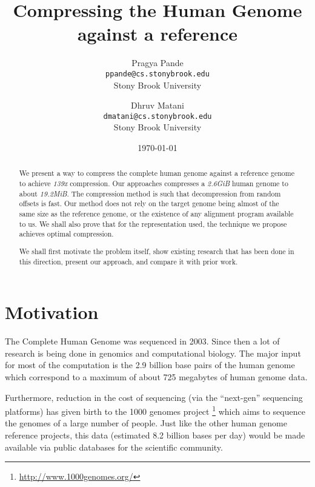 \documentclass[11pt]{article}
\begin{document}
\title{Compressing the Human Genome against a reference}
\author{Pragya Pande\\\texttt{\small{ppande@cs.stonybrook.edu}}\\\small{Stony Brook University} \and 
  Dhruv Matani\\\texttt{\small{dmatani@cs.stonybrook.edu}}\\\small{Stony Brook University}
}
\date{\today}

\maketitle

\vspace{0.5in}

\begin{abstract}
  We present a way to compress the complete human genome against a
  reference genome to achieve \textit{139x} compression. Our
  approaches compresses a \textit{2.6GiB} human genome to about
  \textit{19.2MiB}. The compression method is such that decompression
  from random offsets is fast. Our method does not rely on the target
  genome being almost of the same size as the reference genome, or the
  existence of any alignment program available to us. We shall also
  prove that for the representation used, the technique we propose
  achieves optimal compression.

  We shall first motivate the problem itself, show existing research
  that has been done in this direction, present our approach, and
  compare it with prior work.

\end{abstract}

\clearpage

\section{Motivation}

The Complete Human Genome was sequenced in 2003. Since then a lot of
research is being done in genomics and computational biology. The
major input for most of the computation is the 2.9 billion base pairs
\cite{howmuchsequenced}\cite{findinghumangenome} of the human genome
which correspond to a maximum of about 725 megabytes of human
genome data.\cite{wikipediahumangenome}

Furthermore, reduction in the cost of sequencing (via the ``next-gen''
sequencing platforms) has given birth to the 1000 genomes project
\footnote{\url{http://www.1000genomes.org/}} which aims to sequence
the genomes of a large number of people. Just like the other human
genome reference projects, this data (estimated 8.2 billion bases per
day) would be made available via public databases for the scientific
community.\cite{1000genomes}
\end{document}
